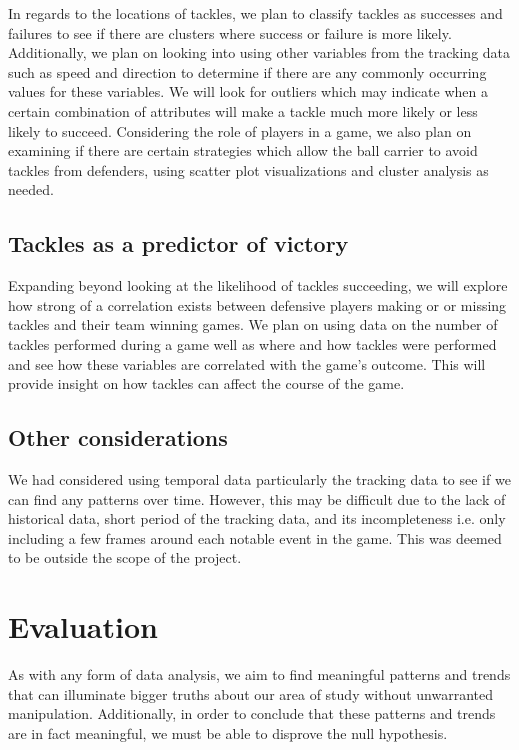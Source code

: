 \documentclass[bibtex, sigconf, hyperref={colorlinks=true,linkcolor=blue,urlcolor=blue}]{acmart}
\begin{document}
In regards to the locations of tackles, we plan to classify tackles as
successes and failures to see if there are clusters where success or failure is
more likely. Additionally, we plan on looking into using other variables from
the tracking data such as speed and direction to determine if there are any
commonly occurring values for these variables. We will look for outliers which
may indicate when a certain combination of attributes will make a tackle much
more likely or less likely to succeed. Considering the role of players in a
game, we also plan on examining if there are certain strategies which allow the
ball carrier to avoid tackles from defenders, using scatter plot visualizations
and cluster analysis as needed.

\subsection{Tackles as a predictor of victory}

Expanding beyond looking at the likelihood of tackles succeeding, we will
explore how strong of a correlation exists between defensive players making or
or missing tackles and their team winning games.
We plan on using data on the number of tackles performed during a game well as
where and how tackles were performed and see how these variables are correlated
with the game's outcome.
This will provide insight on how tackles can affect the course of the game.

\subsection{Other considerations}

We had considered using temporal data particularly the tracking data to see if
we can find any patterns over time. However, this may be difficult due to the
lack of historical data, short period of the tracking data, and its
incompleteness i.e. only including a few frames around each notable event in the
game. This was deemed to be outside the scope of the project.

\section{Evaluation}

As with any form of data analysis, we aim to find meaningful patterns and trends
that can illuminate bigger truths about our area of study without unwarranted
manipulation. Additionally, in order to conclude that these patterns and trends are
in fact meaningful, we must be able to disprove the null hypothesis.
\end{document}
